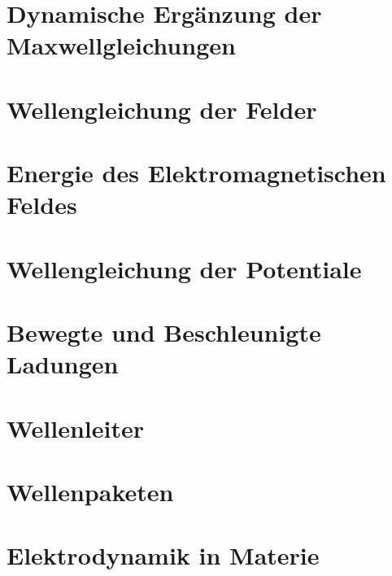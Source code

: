 \section{Dynamische Ergänzung der Maxwellgleichungen}%
\label{sec:dynamische-ergaenzungen}


\newpage
\section{Wellengleichung der Felder}%
\label{sec:wellengleichung}


\newpage
\section{Energie des Elektromagnetischen Feldes}%
\label{sec:energie-EM-feld}


\newpage
\section{Wellengleichung der Potentiale}%
\label{sec:pot-wellengleichung}


\newpage
\section{Bewegte und Beschleunigte Ladungen}%
\label{sec:Bewegte und Beschleunigte Ladungen}


\newpage
\section{Wellenleiter}%
\label{sec:Wellenleiter}


\newpage
\section{Wellenpaketen}%
\label{sec:Wellenpaketen}


\newpage
\section{Elektrodynamik in Materie}%
\label{sec:Elektrodynamik in Materie}

